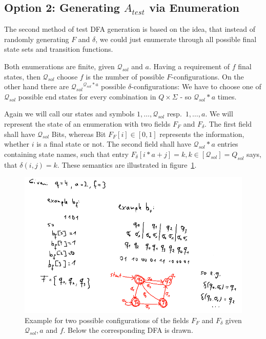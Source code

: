 \subsection{Option 2: Generating $A_{test}$ via Enumeration}


The second method of test DFA generation is based on the idea, that instead of randomly generating $F$ and $\delta$, we could just enumerate through all possible final state sets and transition functions.


Both enumerations are finite, given $\mathcal{Q}_{sol}$ and $a$. Having a requirement of $f$ final states, then $\mathcal{Q}_{sol}$ choose $f$ is the number of possible $F$-configurations. On the other hand there are ${\mathcal{Q}_{sol}}^{\mathcal{Q}_{sol}*a}$ possible $\delta$-configurations: We have to choose one of $\mathcal{Q}_{sol}$ possible end states for every combination in $Q\times\Sigma$ - so $\mathcal{Q}_{sol}*a$ times.


Again we will call our states and symbols $1,\ldots,\mathcal{Q}_{sol}$ resp.\ $1,\ldots,a$. We will represent the state of an enumeration with two fields $F_F$ and $F_\delta$. The first field shall have $\mathcal{Q}_{sol}$ Bits, whereas Bit $F_F[i] \in [0,1]$ represents the information, whether $i$ is a final state or not. The second field shall have $\mathcal{Q}_{sol}*a$ entries containing state names, such that entry $F_\delta[i * a + j] = k, k\in[\mathcal{Q}_{sol}]=Q_{sol}$ says, that $\delta(i, j) = k$. These semantics are illustrated in figure~\ref{fig:dfa_enum_bit_fields}.


\begin{figure}
	\includegraphics[width=\linewidth]{images/dfa_enum_bit_fields.png}
	\caption{Example for two possible configurations of the fields $F_F$ and $F_\delta$ given $\mathcal{Q}_{sol}, a$ and $f$. Below the corresponding DFA is drawn.}
	\label{fig:dfa_enum_bit_fields}
\end{figure}

